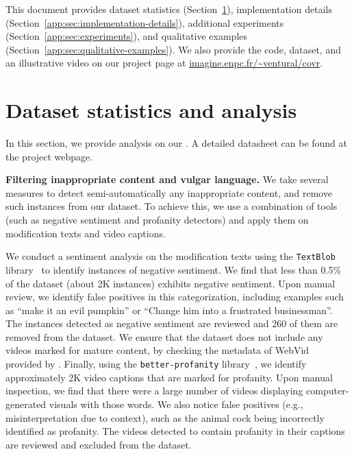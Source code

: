 \renewcommand{\thefigure}{A.\arabic{figure}} \setcounter{figure}{0} 
\renewcommand{\thetable}{A.\arabic{table}}
\setcounter{table}{0} 

\appendix


This document provides 
dataset statistics (Section~\ref{app:sec:dataset-statistics}),
implementation details (Section~\ref{app:sec:implementation-details}),
additional experiments (Section~\ref{app:sec:experiments}),
and qualitative examples (Section~\ref{app:sec:qualitative-examples}).
We also provide the code, dataset, and an illustrative video on our project page at \href{https://imagine.enpc.fr/~ventural/covr}{imagine.enpc.fr/\textasciitilde ventural/covr}.



    


\section{Dataset statistics and analysis}
\label{app:sec:dataset-statistics}

In this section, we provide analysis on our \ourDS.
A detailed datasheet can be found at the project webpage.

\noindent\textbf{Filtering inappropriate content and vulgar language.}
We take several measures to detect semi-automatically any inappropriate
content, and remove such instances from our dataset. To achieve this, we 
use a combination of tools (such as negative sentiment and profanity detectors)
and apply them on modification texts and video captions.

We conduct a sentiment analysis on the modification texts using the \texttt{TextBlob} library~\cite{textblob}
to identify instances of negative sentiment. We find that less than 0.5\% of the dataset (about 2K instances) exhibits negative sentiment. 
Upon manual review, we identify false positives in this categorization,
including examples such as ``make it an evil pumpkin'' or
``Change him into a frustrated businessman''.
The instances detected as negative sentiment are reviewed and
260 of them are removed from the dataset. 
We ensure that the dataset does not
include any videos marked for mature content, by checking the metadata of
WebVid~\cite{bain21_frozen} provided by \cite{cleanvid}.
Finally, using the \texttt{better-profanity} library~\cite{better_profanity},
we identify approximately 2K video captions that are marked for profanity.
Upon manual inspection, we find that
there were a large number of videos displaying computer-generated visuals with those words.
We also notice false positives (e.g., misinterpretation due to context),
such as the animal cock being incorrectly identified as profanity.
The videos detected to contain profanity in their captions
are reviewed and excluded from the dataset. 

